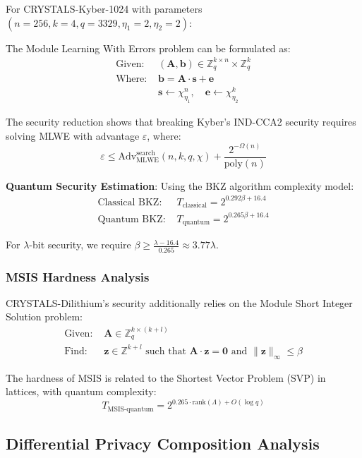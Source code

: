 \documentclass[onecolumn,11pt]{article}
\begin{document}
For CRYSTALS-Kyber-1024 with parameters $(n=256, k=4, q=3329, \eta_1=2, \eta_2=2)$:

The Module Learning With Errors problem can be formulated as:
\begin{align}
\text{Given: } &(\mathbf{A}, \mathbf{b}) \in \mathbb{Z}_q^{k \times n} \times \mathbb{Z}_q^k \\
\text{Where: } &\mathbf{b} = \mathbf{A} \cdot \mathbf{s} + \mathbf{e} \\
&\mathbf{s} \leftarrow \chi_{\eta_1}^n, \quad \mathbf{e} \leftarrow \chi_{\eta_2}^k
\end{align}

The security reduction shows that breaking Kyber's IND-CCA2 security requires solving MLWE with advantage $\varepsilon$, where:
$$\varepsilon \leq \text{Adv}_{\text{MLWE}}^{\text{search}}(n, k, q, \chi) + \frac{2^{-\Omega(n)}}{\text{poly}(n)}$$

\textbf{Quantum Security Estimation}: Using the BKZ algorithm complexity model:
\begin{align}
\text{Classical BKZ: } &T_{\text{classical}} = 2^{0.292 \beta + 16.4} \\
\text{Quantum BKZ: } &T_{\text{quantum}} = 2^{0.265 \beta + 16.4}
\end{align}

For $\lambda$-bit security, we require $\beta \geq \frac{\lambda - 16.4}{0.265} \approx 3.77\lambda$.

\subsubsection{MSIS Hardness Analysis}

CRYSTALS-Dilithium's security additionally relies on the Module Short Integer Solution problem:
\begin{align}
\text{Given: } &\mathbf{A} \in \mathbb{Z}_q^{k \times (k+l)} \\
\text{Find: } &\mathbf{z} \in \mathbb{Z}^{k+l} \text{ such that } \mathbf{A} \cdot \mathbf{z} = \mathbf{0} \text{ and } \|\mathbf{z}\|_\infty \leq \beta
\end{align}

The hardness of MSIS is related to the Shortest Vector Problem (SVP) in lattices, with quantum complexity:
$$T_{\text{MSIS-quantum}} = 2^{0.265 \cdot \text{rank}(\Lambda) + O(\log q)}$$

\subsection{Differential Privacy Composition Analysis}
\end{document}

